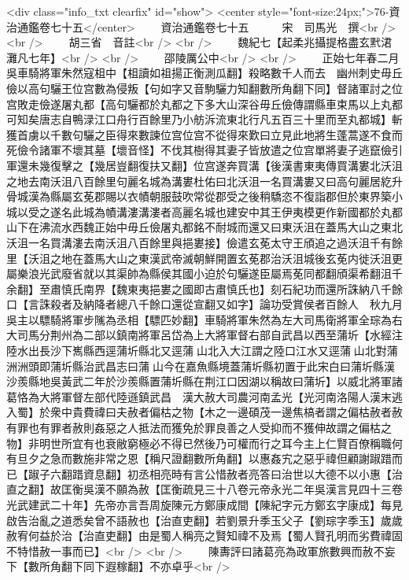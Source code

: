 <div class="info_txt clearfix" id="show">
<center style="font-size:24px;">76-資治通鑑卷七十五</center>
  　　資治通鑑卷七十五　　　宋　司馬光　撰<br />
<br />
　　胡三省　音註<br />
<br />
　　魏紀七【起柔兆攝提格盡玄黓涒灘凡七年】<br />
<br />
　　邵陵厲公中<br />
<br />
　　正始七年春二月吳車騎將軍朱然寇柤中【柤讀如祖揚正衡測瓜翻】殺略數千人而去　幽州刺史毋丘儉以高句驪王位宫數為侵叛【句如字又音駒驪力知翻數所角翻下同】督諸軍討之位宫敗走儉遂屠丸都【高句驪都於丸都之下多大山深谷毋丘儉傳謂縣車束馬以上丸都可知矣唐志自鴨渌江口舟行百餘里乃小舫泝流東北行凡五百三十里而至丸都城】斬獲首虜以千數句驪之臣得來數諫位宫位宫不從得來歎曰立見此地將生蓬蒿遂不食而死儉令諸軍不壞其墓【壞音怪】不伐其樹得其妻子皆放遣之位宫單將妻子逃竄儉引軍還未幾復擊之【幾居豈翻復扶又翻】位宫遂奔買溝【後漢書東夷傳買溝婁北沃沮之地去南沃沮八百餘里句麗名城為溝婁杜佑曰北沃沮一名買溝婁又曰高句麗居紇升骨城漢為縣屬玄莬郡賜以衣幘朝服鼓吹常從郡受之後稍驕恣不復詣郡但於東界築小城以受之遂名此城為幘溝漊溝漊者高麗名城也建安中其王伊夷模更作新國都於丸都山下在沸流水西魏正始中毋丘儉屠丸都銘不耐城而還又曰東沃沮在蓋馬大山之東北沃沮一名買溝漊去南沃沮八百餘里與挹婁接】儉遣玄莬太守王頎追之過沃沮千有餘里【沃沮之地在蓋馬大山之東漢武帝滅朝鮮開置玄莬郡治沃沮城後玄莬内徙沃沮更屬樂浪光武廢省就以其渠帥為縣侯其國小迫於句驪遂臣屬焉莬同都翻頎渠希翻沮千余翻】至肅慎氏南界【魏東夷挹婁之國即古肅慎氏也】刻石紀功而還所誅納八千餘口【言誅殺者及納降者總八千餘口還從宣翻又如字】論功受賞侯者百餘人　秋九月吳主以驃騎將軍步隲為丞相【驃匹妙翻】車騎將軍朱然為左大司馬衛將軍全琮為右大司馬分荆州為二部以鎮南將軍呂岱為上大將軍督右部自武昌以西至蒲圻【水經注陸水出長沙下嶲縣西逕蒲圻縣北又逕蒲山北入大江謂之陸口江水又逕蒲山北對蒲洲洲頭即蒲圻縣治武昌志曰蒲山今在嘉魚縣境蓋蒲圻縣初置于此宋白曰蒲圻縣漢沙羨縣地吳黃武二年於沙羨縣置蒲圻縣在荆江口因湖以稱故曰蒲圻】以威北將軍諸葛恪為大將軍督左部代陸遜鎮武昌　漢大赦大司農河南孟光【光河南洛陽人漢末逃入蜀】於衆中貴費禕曰夫赦者偏枯之物【木之一邊碩茂一邊焦槁者謂之偏枯赦者赦有罪也有罪者赦則姦惡之人抵法而獲免於罪良善之人受抑而不獲伸故謂之偏枯之物】非明世所宜有也衰敝窮極必不得已然後乃可權而行之耳今主上仁賢百僚稱職何有旦夕之急而數施非常之恩【稱尺證翻數所角翻】以惠姦宄之惡乎禕但顧謝踧踖而已【踧子六翻踖資息翻】初丞相亮時有言公惜赦者亮答曰治世以大德不以小惠【治直之翻】故匡衡吳漢不願為赦【匡衡疏見三十八卷元帝永光二年吳漢言見四十三卷光武建武二十年】先帝亦言吾周旋陳元方鄭康成間【陳紀字元方鄭玄字康成】每見啟告治亂之道悉矣曾不語赦也【治直吏翻】若劉景升季玉父子【劉琮字季玉】歲歲赦宥何益於治【治直吏翻】由是蜀人稱亮之賢知禕不及焉【蜀人賢孔明而劣費禕固不特惜赦一事而已】<br />
<br />
　　陳夀評曰諸葛亮為政軍旅數興而赦不妄下【數所角翻下同下遐稼翻】不亦卓乎<br />
